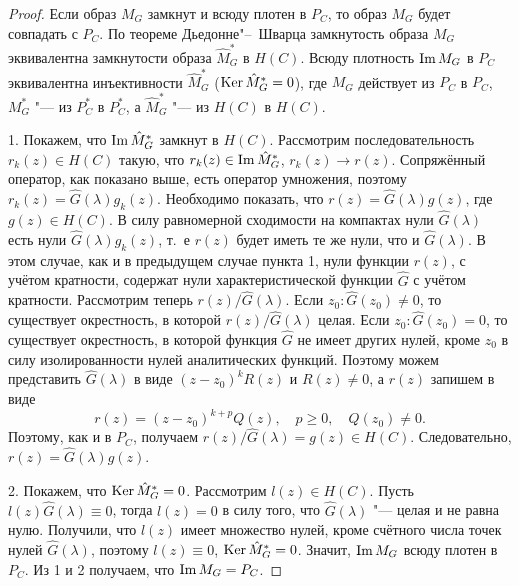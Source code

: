 \begin{proof} Если образ $M_G$ замкнут и всюду плотен в $P_C$, то образ $M_G$ будет совпадать с $P_C$. По теореме Дьедонне"--~Шварца \cite{zabirova3} замкнутость образа $M_G$ эквивалентна замкнутости образа $\hat M^*_G$ в $H(C)$. Всюду плотность $\mathop{\rm Im} M_G$ в $P_C$ эквивалентна инъективности $\hat M^*_G$  ($\mathop{\rm Ker} \hat M^*_G=0$), где $M_G$ действует из $P_C$ в $P_C$, $M^*_G$ "--- из $P^*_C$ в $P^*_C$, а $\hat M^*_G$ "--- из $H(C)$ в $H(C)$.

1. Покажем, что $\mathop{\rm Im} \hat M_G^*$ замкнут в $H(C)$. 
Рассмотрим последовательность $r_k(z)\in H(C)$ такую, что $r_k(z)\in \mathop{\rm Im} \hat M^*_G$, $r_k(z)\to r(z)$. 
Сопряжённый оператор, как показано выше, есть оператор умножения, поэтому $r_k(z)=\hat G(\lambda)g_k(z)$. 
Необходимо показать, что $r(z)=\hat G(\lambda)g(z)$, где $g(z)\in H(C)$. В силу равномерной сходимости на компактах нули $\hat G(\lambda)$ есть нули $\hat G(\lambda)g_k(z)$, т.~е $r(z)$ будет иметь те же нули, что и $\hat G(\lambda)$. В этом случае, как и в предыдущем случае пункта 1, нули функции $r(z)$, с учётом кратности, содержат нули характеристической функции $\hat G$ с учётом кратности.  
Рассмотрим теперь ${r(z)}/{\hat G(\lambda)}$. 
Если $z_0:\hat G(z_0)\neq 0$, то существует окрестность, в которой ${r(z)}/{\hat G(\lambda)}$ целая. Если $z_0:\hat G(z_0)=0$, то существует окрестность, в которой функция $\hat G$ не имеет других нулей, кроме $z_0$ в силу изолированности нулей аналитических функций. 
Поэтому можем представить $\hat G(\lambda)$ в виде $(z-z_0)^kR(z)$ и $R(z)\neq 0$, а $r(z)$ запишем в виде 
$$r(z)=(z-z_0)^{k+p}Q(z), \quad  p\geq 0, \quad  Q(z_0)\neq 0.$$ 
Поэтому, как и в $P_C$, получаем ${r(z)}/{\hat G(\lambda)}=g(z)\in H(C)$. Следовательно, $r(z)=\hat G(\lambda)g(z)$. 

2. Покажем, что $\mathop{\rm Ker} \hat M^*_G={0}$. 
Рассмотрим $l(z)\in H(C)$. Пусть $l(z)\hat G(\lambda)\equiv 0$, тогда $l(z)=0$ в силу того, что $\hat G(\lambda)$ "--- целая и не равна нулю. 
Получили, что $l(z)$ имеет множество нулей, кроме счётного числа точек нулей $\hat G(\lambda)$, поэтому $l(z)\equiv 0$, $\mathop{\rm Ker} \hat M^*_G ={0}$. 
Значит,  $\mathop{\rm Im} M_G$ всюду плотен в $P_C$. Из 1 и 2 получаем, что $\mathop{\rm Im} M_G=P_C$.  \end{proof}


\smallskip

